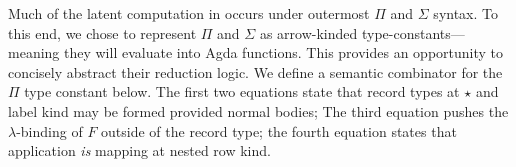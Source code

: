 \documentclass[authoryear, acmsmall, screen, review, nonacm]{acmart}
\begin{document}
Much of the latent computation in \Rome occurs under outermost $\Pi$ and $\Sigma$ syntax. To this end, we chose to represent $\Pi$ and $\Sigma$ as arrow-kinded type-constants---meaning they will evaluate into Agda functions. This provides an opportunity to concisely abstract their reduction logic. We define a semantic combinator for the $\Pi$ type constant below. The first two equations state that record types at $\star$ and label kind may be formed provided normal bodies; The third equation pushes the $\lambda$-binding of $F$ outside of the record type; the fourth equation states that application \emph{is} mapping at nested row kind.

\begin{code}%
\>[0]\AgdaSpace{}%
\AgdaSymbol{:}\AgdaSpace{}%
\AgdaSpace{}%
\AgdaSpace{}%
\AgdaOperator{\AgdaInductiveConstructor{R[}}\AgdaSpace{}%
\AgdaSpace{}%
\AgdaOperator{\AgdaInductiveConstructor{]}}\AgdaSpace{}%
\AgdaSpace{}%
\AgdaSpace{}%
\AgdaSpace{}%
\<%
\\
\>[0]\AgdaSpace{}%
\AgdaSymbol{\{}\AgdaSpace{}%
\AgdaSymbol{=}\AgdaSpace{}%
\AgdaSymbol{\}}\AgdaSpace{}%
\AgdaSpace{}%
\AgdaSymbol{=}\AgdaSpace{}%
\AgdaSpace{}%
\AgdaSymbol{(}\AgdaSpace{}%
\AgdaSymbol{)}\<%
\\
\>[0]\AgdaSpace{}%
\AgdaSymbol{\{}\AgdaSpace{}%
\AgdaSymbol{=}\AgdaSpace{}%
\AgdaSymbol{\}}\AgdaSpace{}%
\AgdaSpace{}%
\AgdaSymbol{=}\AgdaSpace{}%
\AgdaSpace{}%
\AgdaSymbol{(}\AgdaSpace{}%
\AgdaSymbol{)}\<%
\\
\>[0]\AgdaSpace{}%
\AgdaSymbol{\{}\AgdaSpace{}%
\AgdaSymbol{=}\AgdaSpace{}%
\AgdaSpace{}%
\AgdaSpace{}%
\AgdaSymbol{\}}\AgdaSpace{}%
\AgdaSpace{}%
\AgdaSymbol{=}\AgdaSpace{}%
\AgdaSpace{}%
\AgdaSpace{}%
\AgdaSpace{}%
\AgdaSpace{}%
\AgdaSpace{}%
\AgdaSymbol{(}\AgdaSpace{}%
\AgdaSpace{}%
\AgdaSpace{}%
\AgdaSpace{}%
\AgdaSymbol{)}\<%
\\
\>[0]\AgdaSpace{}%
\AgdaSymbol{\{}\AgdaSpace{}%
\AgdaSymbol{=}\AgdaSpace{}%
\AgdaOperator{\AgdaInductiveConstructor{R[}}\AgdaSpace{}%
\AgdaSpace{}%
\AgdaOperator{\AgdaInductiveConstructor{]}}\AgdaSymbol{\}}\AgdaSpace{}%
\AgdaSpace{}%
\AgdaSymbol{=}\AgdaSpace{}%
\AgdaSpace{}%
\AgdaSpace{}%
\AgdaSpace{}%
\AgdaSpace{}%
\AgdaSpace{}%
\AgdaSymbol{)}\AgdaSpace{}%
\AgdaSpace{}%
\<%
\end{code} 
\end{document}
